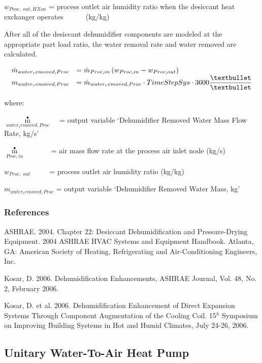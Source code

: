 \({w_{Proc,\,\,out,HXon}}\) = process outlet air humidity ratio when the desiccant heat exchanger operates ~ ~~~~(kg/kg)

After all of the desiccant dehumidifier components are modeled at the appropriate part load ratio, the water removal rate and water removed are calculated.

\begin{equation}
  \begin{array}{rl}
    \dot{m}_{water_removed,Proc} & = \dot{m}_{Proc,in} \PB{w_{Proc,in} - w_{Proc,out}} \\
    m_{water_removed,Proc}       & = \dot{m}_{water_removed,Proc} \cdot TimeStepSys \cdot 3600\dfrac{•}{•}
  \end{array}
\end{equation}

where:

\({\mathop m\limits^ \bullet_{water_removed,Proc}}\) ~ = output variable `Dehumidifier Removed Water Mass Flow Rate, kg/s'

\({\mathop m\limits^ \bullet_{Proc,in}}\) ~~~~~~ = air mass flow rate at the process air inlet node (kg/s)

\({w_{Proc,\,\,out}}\) ~~~~ = process outlet air humidity ratio (kg/kg)

\({m_{water_removed,Proc}}\) = output variable `Dehumidifier Removed Water Mass, kg'

\subsubsection{References}\label{references-000}

ASHRAE. 2004. Chapter 22: Desiccant Dehumidification and Pressure-Drying Equipment. 2004 ASHRAE HVAC Systems and Equipment Handbook. Atlanta, GA: American Society of Heating, Refrigerating and Air-Conditioning Engineers, Inc.

Kosar, D. 2006. Dehumidification Enhancements, ASHRAE Journal, Vol. 48, No. 2, February 2006.

Kosar, D. et al. 2006. Dehumidification Enhancement of Direct Expansion Systems Through Component Augmentation of the Cooling Coil. 15\(^{h}\) Symposium on Improving Building Systems in Hot and Humid Climates, July 24-26, 2006.

\subsection{Unitary Water-To-Air Heat Pump}\label{unitary-water-to-air-heat-pump}

